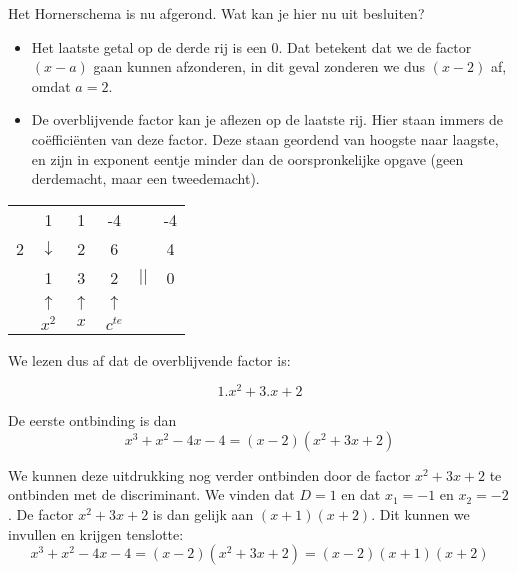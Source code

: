 \begin{voorbeeld}
Het Hornerschema is nu afgerond. Wat kan je hier nu uit besluiten?
\begin{itemize}
	\item Het laatste getal op de derde rij is een $0$. Dat betekent dat we de factor $(x-a)$ gaan kunnen afzonderen, in dit geval zonderen we dus $(x-2)$ af, omdat $a=2$.
	\item De overblijvende factor kan je aflezen op de laatste rij. Hier staan immers de co\"effici\"enten van deze factor. Deze staan geordend van hoogste naar laagste, en zijn in exponent eentje minder dan de oorspronkelijke opgave (geen derdemacht, maar een tweedemacht).
\end{itemize}

\begin{center}
	\begin{tabular}{c|ccccc}
		& 1 & 1 & -4 & & -4 \\
		2 & $\downarrow$ & 2 & 6 & & 4\\
		\hline 
		& 1 & 3 & 2 & $||$ & 0 \\
		& $\uparrow$ & $\uparrow$ & $\uparrow$ & & \\
		& $x^2$ & $x$ & $c^{te}$ & &
	\end{tabular}
\end{center}

We lezen dus af dat de overblijvende factor is:

\begin{equation*}
1.x^2+3.x+2
\end{equation*}

De eerste ontbinding is dan
\begin{equation*}
x^3+x^2-4x-4=(x-2)(x^2+3x+2)
\end{equation*}


We kunnen deze uitdrukking nog verder ontbinden door de factor $x^2+3x+2$ te ontbinden met de discriminant. We vinden dat $D=1$ en dat $x_1=-1$ en $x_2=-2$. De factor $x^2+3x+2$  is dan gelijk aan $(x+1)(x+2)$. Dit kunnen we invullen en krijgen tenslotte:
\begin{equation*}
x^3+x^2-4x-4=(x-2)(x^2+3x+2)=(x-2)(x+1)(x+2)
\end{equation*}


\end{voorbeeld}
